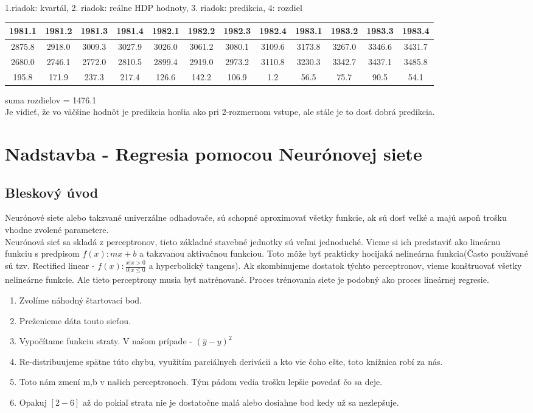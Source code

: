 \documentclass{article}
\begin{document}
1.riadok: kvartál, 2. riadok: reálne HDP hodnoty, 3. riadok: predikcia, 4: rozdiel 
\begin{center}
\begin{tabular}{|| c | c | c | c | c | c | c | c | c | c | c | c ||} 
\hline
 1981.1 & 1981.2 & 1981.3 & 1981.4 & 1982.1 & 1982.2 & 1982.3 & 1982.4 & 1983.1 & 1983.2 & 1983.3 & 1983.4 \\  
\hline\hline
 2875.8 & 2918.0 & 3009.3 & 3027.9 & 3026.0 & 3061.2 & 3080.1 & 3109.6 & 3173.8 & 3267.0 & 3346.6 & 3431.7 \\ 
\hline
 2680.0 & 2746.1 & 2772.0 & 2810.5 & 2899.4 & 2919.0 & 2973.2 & 3110.8 & 3230.3 & 3342.7 & 3437.1 & 3485.8 \\
\hline
 195.8 & 171.9 & 237.3 & 217.4 & 126.6 & 142.2 & 106.9 & 1.2 & 56.5 & 75.7 & 90.5 & 54.1 \\  
\hline
\end{tabular}
\end{center}
suma rozdielov = 1476.1 \\ 
Je vidieť, že vo väčšine hodnôt je predikcia horšia ako pri 2-rozmernom vstupe, ale stále je to dosť dobrá predikcia.
\section{Nadstavba - Regresia pomocou Neurónovej siete}
\subsection{Bleskový úvod}
Neurónové siete alebo takzvané univerzálne odhadovače, sú schopné aproximovať všetky funkcie, ak sú dosť veľké a majú aspoň trošku vhodne zvolené parametere.\\
Neurónová sieť sa skladá z perceptronov, tieto základné stavebné jednotky sú veľmi jednoduché. Vieme si ich predstaviť ako lineárnu funkciu s predpisom $f(x):  mx + b$ a takzvanou aktivačnou funkciou. Toto môže byť prakticky hocijaká nelineárna funkcia(Často používané sú tzv. Rectified linear - $f(x): \frac{x | x >0}{0 | x \leq 0}$ a hyperbolický tangens).
Ak skombinujeme dostatok týchto perceptronov, vieme konštruovať všetky nelineárne funkcie.
Ale tieto perceptrony musia byť natrénované. Proces trénovania siete je podobný ako proces lineárnej regresie.
\begin{enumerate}
    \item Zvolíme náhodný štartovací bod.
    \item Preženieme dáta touto sieťou.
    \item Vypočítame funkciu straty. V našom prípade - $(\hat{y} - y)^2$
    \item Re-distribuujeme spätne túto chybu, využitím parciálnych derivácii a kto vie čoho ešte, toto knižnica robí za nás.
    \item Toto nám zmení m,b v našich perceptronoch. Tým pádom vedia trošku lepšie povedať čo sa deje.
    \item Opakuj $[2-6]$ až do pokiaľ strata nie je dostatočne malá alebo dosiahne bod kedy už sa nezlepšuje.
\end{enumerate}
\end{document}
